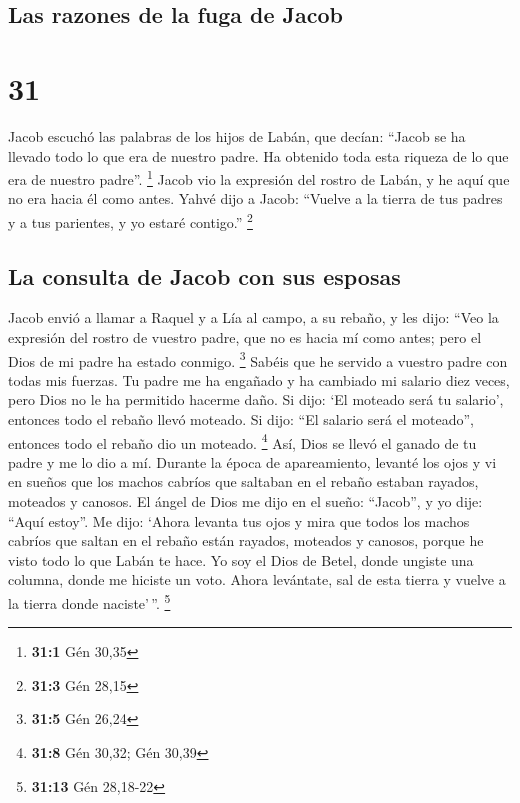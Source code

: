 \hypertarget{las-razones-de-la-fuga-de-jacob}{%
\subsection{Las razones de la fuga de
Jacob}\label{las-razones-de-la-fuga-de-jacob}}

\hypertarget{section-30}{%
\section{31}\label{section-30}}

 Jacob escuchó las palabras de los hijos de Labán, que
decían: ``Jacob se ha llevado todo lo que era de nuestro padre. Ha
obtenido toda esta riqueza de lo que era de nuestro padre''. \footnote{\textbf{31:1}
  Gén 30,35}  Jacob vio la expresión del rostro de Labán,
y he aquí que no era hacia él como antes.  Yahvé dijo a
Jacob: ``Vuelve a la tierra de tus padres y a tus parientes, y yo estaré
contigo.'' \footnote{\textbf{31:3} Gén 28,15}

\hypertarget{la-consulta-de-jacob-con-sus-esposas}{%
\subsection{La consulta de Jacob con sus
esposas}\label{la-consulta-de-jacob-con-sus-esposas}}

 Jacob envió a llamar a Raquel y a Lía al campo, a su
rebaño,  y les dijo: ``Veo la expresión del rostro de
vuestro padre, que no es hacia mí como antes; pero el Dios de mi padre
ha estado conmigo. \footnote{\textbf{31:5} Gén 26,24} 
Sabéis que he servido a vuestro padre con todas mis fuerzas.
 Tu padre me ha engañado y ha cambiado mi salario diez
veces, pero Dios no le ha permitido hacerme daño.  Si
dijo: `El moteado será tu salario', entonces todo el rebaño llevó
moteado. Si dijo: ``El salario será el moteado'', entonces todo el
rebaño dio un moteado. \footnote{\textbf{31:8} Gén 30,32; Gén 30,39}
 Así, Dios se llevó el ganado de tu padre y me lo dio a
mí.  Durante la época de apareamiento, levanté los ojos y
vi en sueños que los machos cabríos que saltaban en el rebaño estaban
rayados, moteados y canosos.  El ángel de Dios me dijo en
el sueño: ``Jacob'', y yo dije: ``Aquí estoy''.  Me dijo:
`Ahora levanta tus ojos y mira que todos los machos cabríos que saltan
en el rebaño están rayados, moteados y canosos, porque he visto todo lo
que Labán te hace.  Yo soy el Dios de Betel, donde
ungiste una columna, donde me hiciste un voto. Ahora levántate, sal de
esta tierra y vuelve a la tierra donde naciste'\,''. \footnote{\textbf{31:13}
  Gén 28,18-22}

